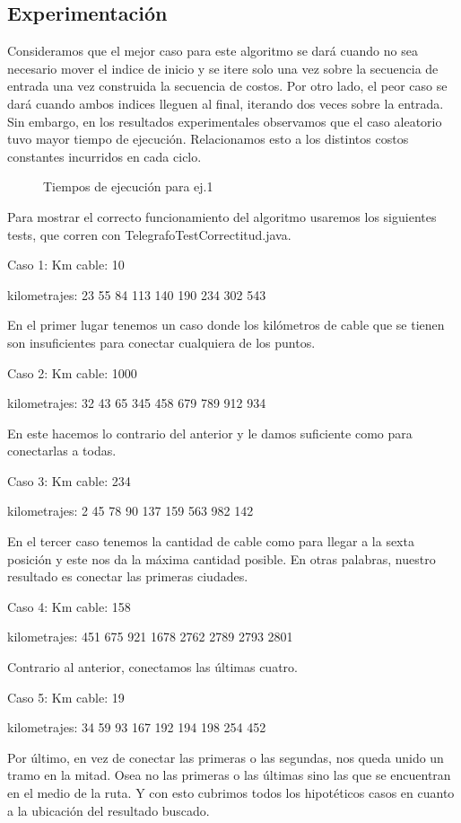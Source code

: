 \subsection{Experimentación}
Consideramos que el mejor caso para este algoritmo se dará cuando no sea necesario mover el indice de inicio y se itere solo una vez sobre la secuencia de entrada una vez construida la secuencia de costos. Por otro lado, el peor caso se dará cuando ambos indices lleguen al final, iterando dos veces sobre la entrada. 
Sin embargo, en los resultados experimentales observamos que el caso aleatorio tuvo mayor tiempo de ejecución. Relacionamos esto a los distintos costos constantes incurridos en cada ciclo.


\begin{figure}[H]
  \centering
  
  \caption{Tiempos de ejecución para ej.1}
\end{figure}

\newpage

Para mostrar el correcto funcionamiento del algoritmo usaremos los siguientes tests, que corren con TelegrafoTestCorrectitud.java.

Caso 1:
Km cable: 10

kilometrajes: 23 55 84 113 140 190 234 302 543

En el primer lugar tenemos un caso donde los kilómetros de cable que se tienen son insuficientes para conectar cualquiera de los puntos.

Caso 2:
Km cable: 1000

kilometrajes: 32 43 65 345 458 679 789 912 934

En este hacemos lo contrario del anterior y le damos suficiente como para conectarlas a todas.

Caso 3:
Km cable: 234

kilometrajes: 2 45 78 90 137 159 563 982 142

En el tercer caso tenemos la cantidad de cable como para llegar a la sexta posición y este nos da la máxima cantidad posible. En otras palabras, nuestro resultado es conectar
las primeras ciudades.

Caso 4:
Km cable: 158

kilometrajes:  451 675 921 1678 2762 2789 2793 2801

Contrario al anterior, conectamos las últimas cuatro.


Caso 5:
Km cable: 19

kilometrajes: 34 59 93 167 192 194 198 254 452

Por último, en vez de conectar las primeras o las segundas, nos queda unido un tramo en la mitad. Osea no las primeras o las últimas sino las que se encuentran en el medio de
la ruta. Y con esto cubrimos todos los hipotéticos casos en cuanto a la ubicación del resultado buscado.









